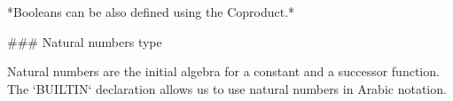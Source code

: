 \begin{code}%
\>[0]\AgdaSpace{}%
\AgdaSymbol{:}\AgdaSpace{}%
\AgdaSpace{}%
\AgdaSpace{}%
\<%
\\
\>[0]\AgdaSpace{}%
%
\>[11]\AgdaSymbol{=}\AgdaSpace{}%
\<%
\\
\>[0]\AgdaSpace{}%
\AgdaSpace{}%
\AgdaSymbol{=}\AgdaSpace{}%
\<%
\end{code}

*Booleans can be also defined using the Coproduct.*

### Natural numbers type

Natural numbers are the initial algebra for a constant and a
successor function. The `BUILTIN` declaration allows us to use
natural numbers in Arabic notation.

\begin{code}%
\>[0]\AgdaSpace{}%
\AgdaSpace{}%
\AgdaSymbol{:}\AgdaSpace{}%
\AgdaSpace{}%
\<%
\\
\>[0][@{}l@{\AgdaIndent{0}}]%
\>[2]\AgdaSpace{}%
\AgdaSymbol{:}\AgdaSpace{}%
\<%
\\
%
\>[2]\AgdaSpace{}%
\AgdaSymbol{:}\AgdaSpace{}%
\AgdaSpace{}%
\AgdaSpace{}%
\<%
\\
%
\\[\AgdaEmptyExtraSkip]%
\>[0]\AgdaSymbol{\{-\#}\AgdaSpace{}%
\AgdaSpace{}%
\AgdaSpace{}%
\AgdaSpace{}%
\AgdaSymbol{\#-\}}\<%
\\
%
\\[\AgdaEmptyExtraSkip]%
\>[0]\<%
\\
\>[0]\AgdaSpace{}%
\AgdaSymbol{=}\AgdaSpace{}%
\<%
\end{code}
